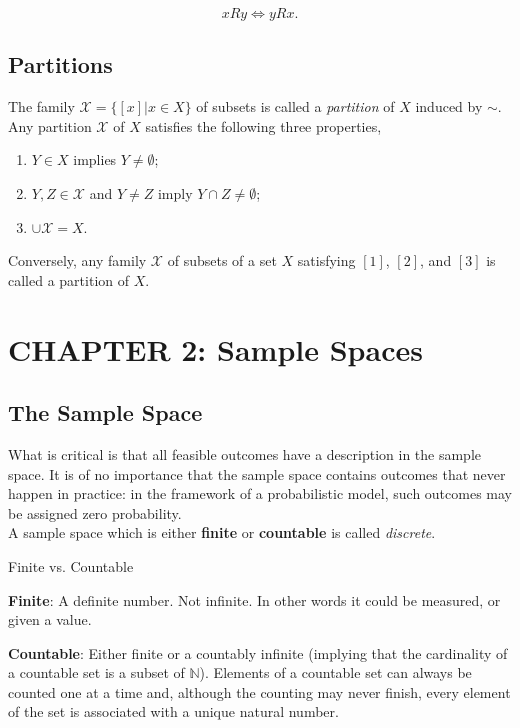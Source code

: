 \documentclass[12pt]{article}
\newcommand{\N}{\mathbb{N}}
\begin{document}
\begin{equation*}
xRy \iff yRx.
\end{equation*}

\subsection*{Partitions}
\noindent
The family $\mathcal{X} = \big \{ [x] \lvert x \in X \big \}$ of subsets is called a \textit{partition} of $X$ induced by $\sim$. Any partition $\mathcal{X}$ of $X$ satisfies the following three properties,

\begin{enumerate}
\item $Y \in X$ implies $Y \neq \emptyset$;
\item $Y,Z \in \mathcal{X}$ and $Y \neq Z$ imply $Y \cap Z \neq \emptyset$;
\item $\cup \mathcal{X} = X$.
\end{enumerate}

\noindent
Conversely, any family $\mathcal{X}$ of subsets of a set $X$ satisfying $[1]$, $[2]$, and $[3]$ is called a partition of $X$.

\section*{CHAPTER 2: Sample Spaces}

\subsection*{The Sample Space}
\noindent
What is critical is that all feasible outcomes have a description in the sample space. It is of no importance that the sample space contains outcomes that never happen in practice: in the framework of a probabilistic model, such outcomes may be assigned zero probability. \\

\noindent
A sample space which is either \textbf{finite} or \textbf{countable} is called \textit{discrete}.  \\

\begin{tcolorbox}
\begin{center}
Finite vs. Countable
\end{center}

\textbf{Finite}: A definite number. Not infinite. In other words it could be measured, or given a value.

\vspace*{.5cm}

\textbf{Countable}: Either finite or a countably infinite (implying that the cardinality of a countable set is a subset of $\N$). Elements of a countable set can always be counted one at a time and, although the counting may never finish, every element of the set is associated with a unique natural number.
\end{tcolorbox}
\end{document}
